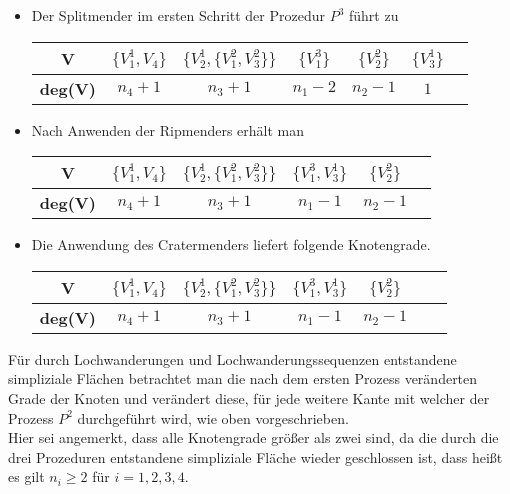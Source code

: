 \documentclass[12pt,titlepage]{article}
\begin{document}
\begin{itemize}
\item Der Splitmender im ersten Schritt der Prozedur $P^3$ führt zu \begin{center}
\begin{tabular}{|c|c|c|c|c|c|c|}
\hline
  \textbf{V} & $\{V_1^1,V_4\}$ & $\{V_2^1,\{V_1^2,V_3^2\}\}$ & $\{V_1^3\}$ & $\{V_2^2\} $  & $\{V_3^1\}$ \\ 
  \hline
   \textbf{deg(V)} & $n_4+1$ & $n_3+1$ & $n_1-2$ & $n_2-1$ & $1$  \\  
   \hline
 \end{tabular}
 \end{center}
\item Nach Anwenden der Ripmenders erhält man \begin{center}
\begin{tabular}{|c|c|c|c|c|c|}
\hline
  \textbf{V} & $\{V_1^1,V_4\}$ & $\{V_2^1,\{V_1^2,V_3^2\}\}$ & $\{V_1^3,V_3^1\}$ & $\{V_2^2\} $   \\ 
  \hline
   \textbf{deg(V)} & $n_4+1$ & $n_3+1$ & $n_1-1$ & $n_2-1$  \\  
   \hline
 \end{tabular}
 \end{center}
\item Die Anwendung des Cratermenders liefert folgende Knotengrade.
\begin{center}
\begin{tabular}{|c|c|c|c|c|c|c|}
\hline
 \textbf{V} & $\{V_1^1,V_4\}$ & $\{V_2^1,\{V_1^2,V_3^2\}\}$ & $\{V_1^3,V_3^1\}$ & $\{V_2^2\} $   \\ 
  \hline
   \textbf{deg(V)} & $n_4+1$ & $n_3+1$ & $n_1-1$ & $n_2-1$  \\  
   \hline
 \end{tabular}
 \end{center}
 \end{itemize}
Für durch Lochwanderungen und Lochwanderungssequenzen entstandene simpliziale Flächen betrachtet man die nach dem ersten Prozess veränderten Grade der Knoten und verändert diese, für jede weitere Kante mit welcher der Prozess $P^2$ durchgeführt wird, wie oben vorgeschrieben.\\
Hier sei angemerkt, dass alle Knotengrade größer als zwei sind, da die durch die drei Prozeduren entstandene simpliziale Fläche wieder geschlossen ist, dass heißt es gilt $n_i \geq 2$ für $i=1,2,3,4$.\\
\end{document}
